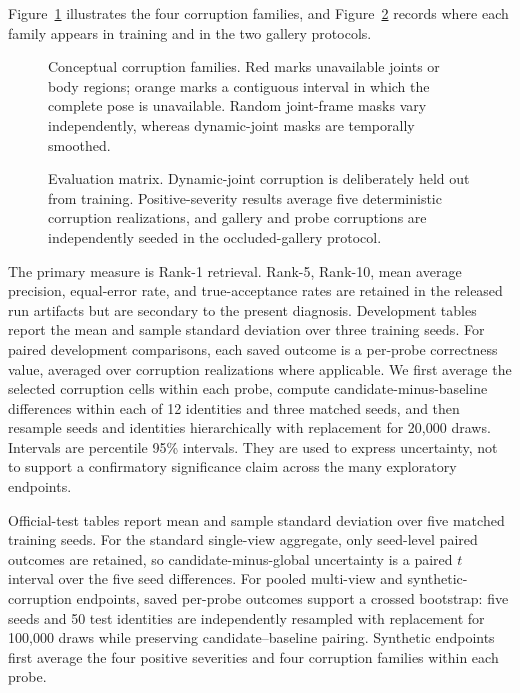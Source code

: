 \documentclass[runningheads]{llncs}
\begin{document}
Figure~\ref{fig:corruptions} illustrates the four corruption families, and
Figure~\ref{fig:evaluation-matrix} records where each family appears in
training and in the two gallery protocols.

\begin{figure}[t]
\centering
\resizebox{\textwidth}{!}{}
\caption{Conceptual corruption families. Red marks unavailable joints or body
regions; orange marks a contiguous interval in which the complete pose is
unavailable. Random joint-frame masks vary independently, whereas dynamic-joint
masks are temporally smoothed.}
\label{fig:corruptions}
\end{figure}

\begin{figure}[t]
\centering
\resizebox{\textwidth}{!}{}
\caption{Evaluation matrix. Dynamic-joint corruption is deliberately held out
from training. Positive-severity results average five deterministic corruption
realizations, and gallery and probe corruptions are independently seeded in the
occluded-gallery protocol.}
\label{fig:evaluation-matrix}
\end{figure}

The primary measure is Rank-1 retrieval. Rank-5, Rank-10, mean average
precision, equal-error rate, and true-acceptance rates are retained in the
released run artifacts but are secondary to the present diagnosis. Development
tables report the mean and sample standard deviation over three training seeds.
For paired development comparisons, each saved outcome is a per-probe correctness value,
averaged over corruption realizations where applicable. We first average the
selected corruption cells within each probe, compute candidate-minus-baseline
differences within each of 12 identities and three matched seeds, and then
resample seeds and identities hierarchically with replacement for 20,000 draws.
Intervals are percentile 95\% intervals. They are used to express uncertainty,
not to support a confirmatory significance claim across the many exploratory
endpoints.

Official-test tables report mean and sample standard deviation over five
matched training seeds. For the standard single-view aggregate, only seed-level
paired outcomes are retained, so candidate-minus-global uncertainty is a paired
$t$ interval over the five seed differences. For pooled multi-view and
synthetic-corruption endpoints, saved per-probe outcomes support a crossed
bootstrap: five seeds and 50 test identities are independently resampled with
replacement for 100,000 draws while preserving candidate--baseline pairing.
Synthetic endpoints first average the four positive severities and four
corruption families within each probe.
\end{document}
